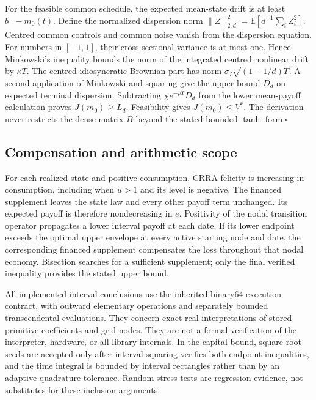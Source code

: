 For the feasible common schedule, the expected mean-state drift is at least $b_--m_0(t)$. Define the normalized dispersion norm $\|Z\|_{2,d}^2=\mathbb E[d^{-1}\sum_i Z_i^2]$. Centred common controls and common noise vanish from the dispersion equation. For numbers in $[-1,1]$, their cross-sectional variance is at most one. Hence Minkowski's inequality bounds the norm of the integrated centred nonlinear drift by $\kappa T$. The centred idiosyncratic Brownian part has norm $\sigma_I\sqrt{(1-1/d)T}$. A second application of Minkowski and squaring give the upper bound $D_d$ on expected terminal dispersion. Subtracting $\chi e^{-\rho T}D_d$ from the lower mean-payoff calculation proves $J(m_0)\geq L_d$. Feasibility gives $J(m_0)\leq V^*$. The derivation never restricts the dense matrix $B$ beyond the stated bounded-$\tanh$ form.\hfill$\square$

\subsection{Compensation and arithmetic scope}
For each realized state and positive consumption, CRRA felicity is increasing in consumption, including when $u>1$ and its level is negative. The financed supplement leaves the state law and every other payoff term unchanged. Its expected payoff is therefore nondecreasing in $e$. Positivity of the nodal transition operator propagates a lower interval payoff at each date. If its lower endpoint exceeds the optimal upper envelope at every active starting node and date, the corresponding financed supplement compensates the loss throughout that nodal economy. Bisection searches for a sufficient supplement; only the final verified inequality provides the stated upper bound.

All implemented interval conclusions use the inherited binary64 execution contract, with outward elementary operations and separately bounded transcendental evaluations. They concern exact real interpretations of stored primitive coefficients and grid nodes. They are not a formal verification of the interpreter, hardware, or all library internals. In the capital bound, square-root seeds are accepted only after interval squaring verifies both endpoint inequalities, and the time integral is bounded by interval rectangles rather than by an adaptive quadrature tolerance. Random stress tests are regression evidence, not substitutes for these inclusion arguments.
